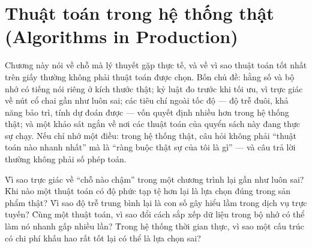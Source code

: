 \documentclass[../../algorithm.tex]{subfiles}
\begin{document}
\chapter{Thuật toán trong hệ thống thật (Algorithms in Production)}

\begin{tomtat}
Chương này nói về chỗ mà lý thuyết gặp thực tế, và về vì sao thuật toán tốt nhất trên giấy thường không phải thuật toán được chọn. Bốn chủ đề: hằng số và bộ nhớ có tiếng nói riêng ở kích thước thật; kỷ luật đo trước khi tối ưu, vì trực giác về nút cổ chai gần như luôn sai; các tiêu chí ngoài tốc độ --- độ trễ đuôi, khả năng bảo trì, tính dự đoán được --- vốn quyết định nhiều hơn trong hệ thống thật; và một khảo sát ngắn về nơi các thuật toán của quyển sách này đang thực sự chạy. Nếu chỉ nhớ một điều: trong hệ thống thật, câu hỏi không phải ``thuật toán nào nhanh nhất'' mà là ``ràng buộc thật sự của tôi là gì'' --- và câu trả lời thường không phải số phép toán.
\end{tomtat}

\begin{nentang}
\end{nentang}

\begin{khoigoi}
\h{Vì sao trực giác về ``chỗ nào chậm'' trong một chương trình lại gần như luôn sai?}
\h{Khi nào một thuật toán có độ phức tạp tệ hơn lại là lựa chọn đúng trong sản phẩm thật?}
\h{Vì sao độ trễ trung bình lại là con số gây hiểu lầm trong dịch vụ trực tuyến?}
\h{Cùng một thuật toán, vì sao đổi cách sắp xếp dữ liệu trong bộ nhớ có thể làm nó nhanh gấp nhiều lần?}
\h{Trong hệ thống thời gian thực, vì sao một cấu trúc có chi phí khấu hao rất tốt lại có thể là lựa chọn sai?}
\end{khoigoi}
\end{document}
